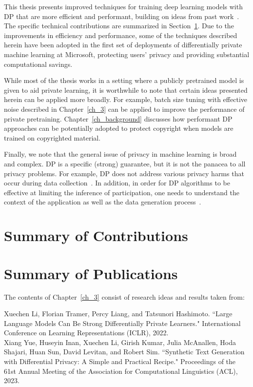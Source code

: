 This thesis presents improved techniques for training deep learning models with DP that are more efficient and performant, building on ideas from past work~\cite{abadi2016deep,tramer2020differentially}.
The specific technical contributions are summarized in Section~\ref{sec:overview_of_results}.
Due to the improvements in efficiency and performance, some of the techniques described herein have been adopted in the first set of deployments of differentially private machine learning at Microsoft, protecting users' privacy and providing substantial computational savings.

While most of the thesis works in a setting where a publicly pretrained model is given to aid private learning, it is worthwhile to note that certain ideas presented herein can be applied more broadly. 
For example, batch size tuning with effective noise described in Chapter~\ref{ch_3} can be applied to improve the performance of private pretraining. 
Chapter~\ref{ch_background} discusses how performant DP approaches can be potentially adopted to protect copyright when models are trained on copyrighted material.

Finally, we note that the general issue of privacy in machine learning is broad and complex.
DP is a specific (strong) guarantee, but it is not the panacea to all privacy problems.
For example, DP does not address various privacy harms that occur during data collection~\cite{solove2005taxonomy}.
In addition, in order for DP algorithms to be effective at limiting the inference of participation, one needs to understand the context of the application as well as the data generation process~\cite{kifer2011no}.

\section{Summary of Contributions}\label{sec:overview_of_results}

\newpage
\section{Summary of Publications}

\noindent The contents of Chapter~\ref{ch_3} consist of research ideas and results taken from:

\begin{mdframed}[leftline=true, topline=false, rightline=false, bottomline=false, linewidth=2pt]
Xuechen Li, Florian Tramer, Percy Liang, and Tatsunori Hashimoto. ``Large Language Models Can Be Strong Differentially Private Learners." International Conference on Learning Representations (ICLR), 2022.~\cite{li2022large}\\

\noindent Xiang Yue, Huseyin Inan, Xuechen Li, Girish Kumar, Julia McAnallen, Hoda Shajari, Huan Sun, David Levitan, and Robert Sim. ``Synthetic Text Generation with Differential Privacy: A Simple and Practical Recipe." Proceedings of the 61st Annual Meeting of the Association for Computational Linguistics (ACL), 2023.~\cite{yue-etal-2023-synthetic}
\end{mdframed}

